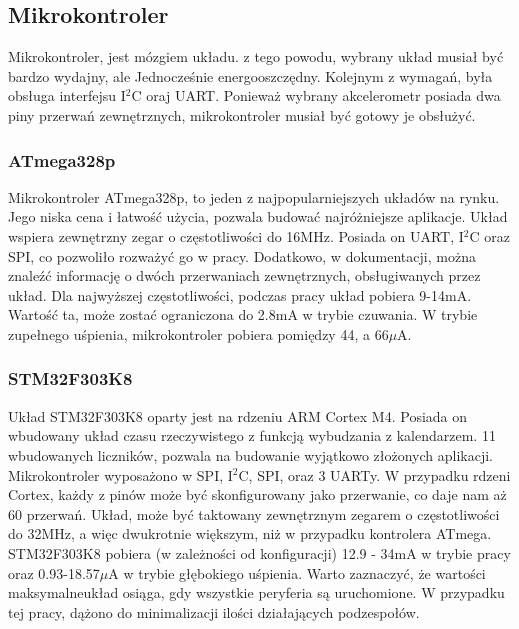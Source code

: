 \subsection{Mikrokontroler}
Mikrokontroler, jest mózgiem układu. z tego powodu, wybrany układ musiał być bardzo wydajny, ale Jednocześnie energooszczędny. Kolejnym z wymagań, była obsługa interfejsu I$^{2}$C oraj UART. Ponieważ wybrany akcelerometr posiada dwa piny przerwań zewnętrznych, mikrokontroler musiał być gotowy je obsłużyć.

\subsubsection{ATmega328p}
Mikrokontroler ATmega328p, to jeden z najpopularniejszych układów na rynku. Jego niska cena i łatwość użycia, pozwala budować najróżniejsze aplikacje. Układ wspiera zewnętrzny zegar o częstotliwości do 16MHz. Posiada on UART, I$^{2}$C oraz SPI, co pozwoliło rozważyć go w pracy. Dodatkowo, w dokumentacji, można znaleźć informację o dwóch przerwaniach zewnętrznych, obsługiwanych przez układ.\cite{ATMEGA328P} Dla najwyższej częstotliwości, podczas pracy układ pobiera 9-14mA. Wartość ta, może zostać ograniczona do 2.8mA w trybie czuwania. W trybie zupełnego uśpienia, mikrokontroler pobiera pomiędzy 44, a 66$\mu$A.

\subsubsection{STM32F303K8}
Układ STM32F303K8 oparty jest na rdzeniu ARM Cortex M4. Posiada on wbudowany układ czasu rzeczywistego z funkcją wybudzania z kalendarzem. 11 wbudowanych liczników, pozwala na budowanie wyjątkowo złożonych aplikacji. Mikrokontroler wyposażono w SPI, I$^{2}$C, SPI, oraz 3 UARTy. W przypadku rdzeni Cortex, każdy z pinów może być skonfigurowany jako przerwanie, co daje nam aż 60 przerwań. \cite{STM32F303K8} Układ, może być taktowany zewnętrznym zegarem o częstotliwości do 32MHz, a więc dwukrotnie większym, niż w przypadku kontrolera ATmega. STM32F303K8 pobiera (w zależności od konfiguracji) 12.9 - 34mA w trybie pracy oraz 0.93-18.57$\mu$A w trybie głębokiego uśpienia. Warto zaznaczyć, że wartości maksymalneukład osiąga, gdy wszystkie peryferia są uruchomione. W przypadku tej pracy, dążono do minimalizacji ilości działających podzespołów.

